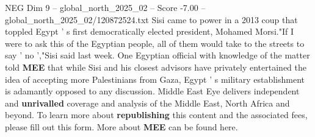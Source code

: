 \begin{textsample}{NEG Dim 9 – global\_north\_2025\_02 – Score -7.00 – global\_north\_2025\_02/120872524.txt}
Sisi came to power in a 2013 coup that toppled Egypt ' s first democratically elected president, Mohamed Morsi."If I were to ask this of the Egyptian people, all of them would take to the streets to say ' no ',"Sisi said last week.
One Egyptian official with knowledge of the matter told \textbf{MEE} that while Sisi and his closest advisors have privately entertained the idea of accepting more Palestinians from Gaza, Egypt ' s military establishment is adamantly opposed to any discussion.
Middle East Eye delivers independent and \textbf{unrivalled} coverage and analysis of the Middle East, North Africa and beyond.
To learn more about \textbf{republishing} this content and the associated fees, please fill out this form.
More about \textbf{MEE} can be found here.

\end{textsample}
